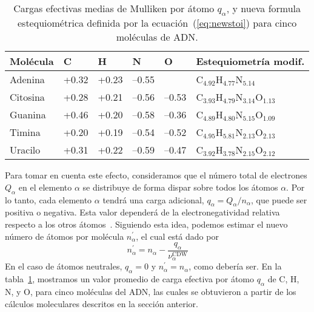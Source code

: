 \begin{table}
\begin{center}
\begin{tabular}{|p{}|p{}|p{}|p{
}|p{}|p{}|}
\hline
Molécula & C & H & N & O & Estequiometría modif. \\
\hline
Adenina & +0.32 & +0.23 & --0.55 &       & 
C$_{4.92}$H$_{4.77}$N$_{5.14}$ \\ 
\hline
Citosina & +0.28 & +0.21 & --0.56 & --0.53 & 
C$_{3.93}$H$_{4.79}$N$_{3.14}$O$_{1.13}$ \\ 
\hline
Guanina & +0.46 & +0.20 & --0.58 & --0.36 & 
C$_{4.89}$H$_{4.80}$N$_{5.15}$O$_{1.09}$ \\ 
\hline
Timina & +0.20 & +0.19 & --0.54 & --0.52 & 
C$_{4.95}$H$_{5.81}$N$_{2.13}$O$_{2.13}$ \\ 
\hline
Uracilo & +0.31 & +0.22 & --0.59 & --0.47 & 
C$_{3.92}$H$_{3.78}$N$_{2.15}$O$_{2.12}$ \\ 
\hline
\end{tabular}
\caption[Cargas efectivas medias de Mulliken por átomo]
{Cargas efectivas medias de Mulliken por átomo $q_{\alpha}$, y nueva formula
estequiométrica definida por la ecuación~(\ref{eq:newstoi}) para cinco
moléculas de ADN.}
\label{tab:newstoi}
\end{center}
\end{table}

Para tomar en cuenta este efecto, consideramos que el número total de 
electrones $Q_{\alpha }$ en el elemento $\alpha$ se distribuye de forma
dispar sobre todos los átomos $\alpha$. Por lo tanto, cada elemento  
$\alpha$ tendrá una carga adicional, $q_{\alpha}=Q_{\alpha}/n_{\alpha}$, 
que puede ser positiva o negativa. Esta valor dependerá de la 
electronegatividad relativa respecto a los otros átomos~\cite{rappe1991}. 
Siguiendo esta idea, podemos estimar el nuevo número de átomos por 
molécula $n_{\alpha }^{\prime }$, el cual está dado por
\begin{equation}
n_{\alpha }^{\prime }=n_{\alpha }-
\frac{q_{\alpha }}{\nu_{\alpha }^{\text{CDW}}}
\label{eq:newstoi}
\end{equation}
En el caso de átomos neutrales, $q_{\alpha}=0$ y 
$n_{\alpha}^{\prime}=n_{\alpha}$, como debería ser. En la 
tabla~\ref{tab:newstoi}, mostramos un valor promedio de carga efectiva por
átomo $q_{\alpha}$ de C, H, N, y O, para cinco moléculas del ADN,
las cuales se obtuvieron a partir de los cálculos moleculares descritos 
en la sección anterior.

